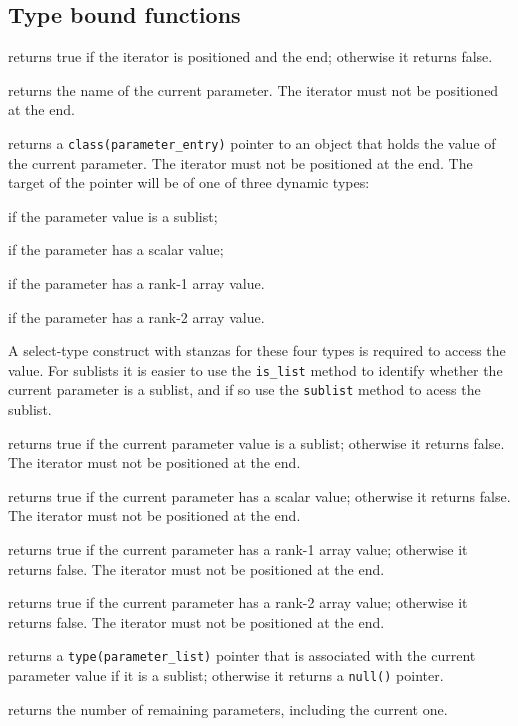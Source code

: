 \documentclass[11pt]{article}
\begin{document}
\subsection{Type bound functions}
\begin{description}[style=nextline]\setlength{\itemsep}{0pt}
\item[\texttt{at_end()}]
  returns true if the iterator is positioned and the end; otherwise it
  returns false.
\item[\texttt{name()}]
  returns the name of the current parameter.  The iterator must not be
  positioned at the end.
\item[\texttt{value()}]
  returns a \texttt{class(parameter_entry)} pointer to an object that holds
  the value of the current parameter.  The iterator must not be positioned
  at the end. The target of the pointer will be of one of three dynamic types:
  \begin{description}\setlength{\itemsep}{0pt}
  \item[\texttt{parameter_list}] if the parameter value is a sublist;
  \item[\texttt{any_scalar}] if the parameter has a scalar value;
  \item[\texttt{any_vector}] if the parameter has a rank-1 array value.
  \item[\texttt{any_matrix}] if the parameter has a rank-2 array value.
  \end{description}
  A select-type construct with stanzas for these four types is required
  to access the value.  For sublists it is easier to use the \texttt{is_list}
  method to identify whether the current parameter is a sublist, and if so
  use the \texttt{sublist} method to acess the sublist.
\item[\texttt{is_list()}]
  returns true if the current parameter value is a sublist; otherwise it
  returns false.  The iterator must not be positioned at the end.
\item[\texttt{is_scalar()}]
  returns true if the current parameter has a scalar value; otherwise it
  returns false.  The iterator must not be positioned at the end.
\item[\texttt{is_vector()}]
  returns true if the current parameter has a rank-1 array value; otherwise it
  returns false.  The iterator must not be positioned at the end.
\item[\texttt{is_matrix()}]
  returns true if the current parameter has a rank-2 array value; otherwise it
  returns false.  The iterator must not be positioned at the end.
\item[\texttt{sublist()}]
  returns a \texttt{type(parameter_list)} pointer that is associated with
  the current parameter value if it is a sublist; otherwise it returns a
  \texttt{null()} pointer.
\item[\texttt{count()}]
  returns the number of remaining parameters, including the current one.
\end{description}
\end{document}
